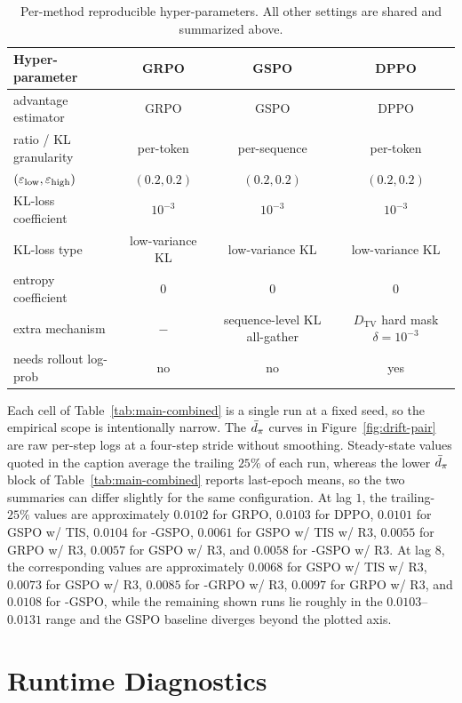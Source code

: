 \begin{table}[h]
\centering
\caption{Per-method reproducible hyper-parameters. All other settings are shared and summarized above.}
\label{tab:hparams}
\small
\setlength{\tabcolsep}{7pt}
\begin{tabular}{@{}lccc@{}}
\toprule
Hyper-parameter & GRPO & GSPO & DPPO \\
\midrule
advantage estimator & GRPO & GSPO & DPPO \\
ratio / KL granularity & per-token & per-sequence & per-token \\
$(\varepsilon_{\mathrm{low}},\varepsilon_{\mathrm{high}})$ & $(0.2,0.2)$ & $(0.2,0.2)$ & $(0.2,0.2)$ \\
KL-loss coefficient & $10^{-3}$ & $10^{-3}$ & $10^{-3}$ \\
KL-loss type & low-variance KL & low-variance KL & low-variance KL \\
entropy coefficient & $0$ & $0$ & $0$ \\
extra mechanism & $-$ & sequence-level KL all-gather & $D_{\mathrm{TV}}$ hard mask $\delta=10^{-3}$ \\
needs rollout log-prob & no & no & yes \\
\bottomrule
\end{tabular}
\end{table}

Each cell of Table~\ref{tab:main-combined} is a single run at a fixed seed, so the empirical scope is intentionally narrow. The $\bar d_\pi$ curves in Figure~\ref{fig:drift-pair} are raw per-step logs at a four-step stride without smoothing. Steady-state values quoted in the caption average the trailing $25\%$ of each run, whereas the lower $\bar d_\pi$ block of Table~\ref{tab:main-combined} reports last-epoch means, so the two summaries can differ slightly for the same configuration. At lag $1$, the trailing-$25\%$ values are approximately $0.0102$ for GRPO, $0.0103$ for DPPO, $0.0101$ for GSPO w/ TIS, $0.0104$ for \satr-GSPO, $0.0061$ for GSPO w/ TIS w/ R3, $0.0055$ for GRPO w/ R3, $0.0057$ for GSPO w/ R3, and $0.0058$ for \satr-GSPO w/ R3. At lag $8$, the corresponding values are approximately $0.0068$ for GSPO w/ TIS w/ R3, $0.0073$ for GSPO w/ R3, $0.0085$ for \satr-GRPO w/ R3, $0.0097$ for GRPO w/ R3, and $0.0108$ for \satr-GSPO, while the remaining shown runs lie roughly in the $0.0103$--$0.0131$ range and the GSPO baseline diverges beyond the plotted axis.

\FloatBarrier

\section{\satr{} Runtime Diagnostics}
\label{app:monitor}

